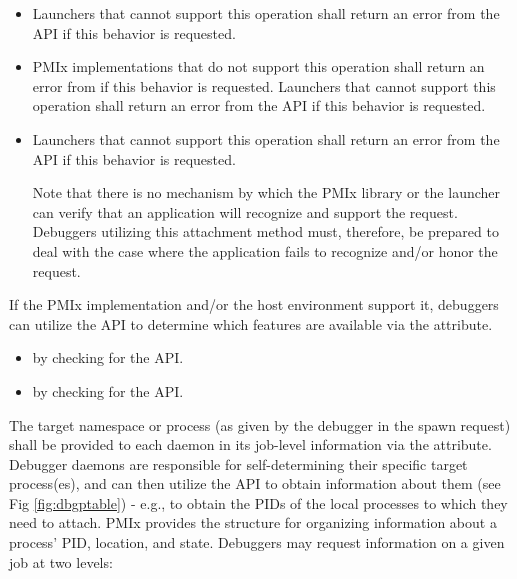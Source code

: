 \begin{itemize}
    \item {}Launchers that cannot support this operation shall return an error from the  \ac{API} if this behavior is requested.
    \pasteAttributeItemEnd{}
    \item {}\ac{PMIx} implementations that do not support this operation shall return an error from  if this behavior is requested. Launchers that cannot support this operation shall return an error from the  \ac{API} if this behavior is requested.
    \pasteAttributeItemEnd{}
    \item {}Launchers that cannot support this operation shall return an error from the  \ac{API} if this behavior is requested.

    Note that there is no mechanism by which the \ac{PMIx} library or the launcher can verify that an application will recognize and support the  request. Debuggers utilizing this attachment method must, therefore, be prepared to deal with the case where the application fails to recognize and/or honor the request.
    \pasteAttributeItemEnd{}
\end{itemize}

If the \ac{PMIx} implementation and/or the host environment support it, debuggers can utilize the  \ac{API} to determine which features are available via the  attribute.

\begin{itemize}
    \item {} by checking  for the  \ac{API}.
    \item {} by checking  for the  \ac{API}.
\end{itemize}

The target namespace or process (as given by the debugger in the spawn request) shall be provided to each daemon in its job-level information via the  attribute. Debugger daemons are responsible for self-determining their specific target process(es), and can then utilize the  \ac{API} to obtain information about them (see Fig \ref{fig:dbgptable}) - e.g., to obtain the \acp{PID} of the local processes to which they need to attach. \ac{PMIx} provides the  structure for organizing information about a process' \ac{PID}, location, and state. Debuggers may request information on a given job at two levels:

